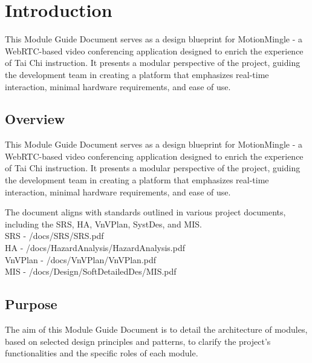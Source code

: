 \documentclass[12pt, titlepage]{article}
\begin{document}
\tableofcontents

\listoftables

\listoffigures

\newpage


\section{Introduction}

This Module Guide Document serves as a design blueprint for MotionMingle - a WebRTC-based video conferencing application designed to enrich the experience of Tai Chi instruction. It presents a modular perspective of the project, guiding the development team in creating a platform that emphasizes real-time interaction, minimal hardware requirements, and ease of use.

\subsection{Overview}
This Module Guide Document serves as a design blueprint for MotionMingle - a WebRTC-based video conferencing application designed to enrich the experience of Tai Chi instruction. It presents a modular perspective of the project, guiding the development team in creating a platform that emphasizes real-time interaction, minimal hardware requirements, and ease of use.

The document aligns with standards outlined in various project documents, including the SRS, HA, VnVPlan, SystDes, and MIS. \\

SRS - /docs/SRS/SRS.pdf \\

HA - /docs/HazardAnalysis/HazardAnalysis.pdf \\

VnVPlan - /docs/VnVPlan/VnVPlan.pdf \\ 

MIS - /docs/Design/SoftDetailedDes/MIS.pdf \\

\subsection{Purpose}
The aim of this Module Guide Document is to detail the architecture of modules, based on selected design principles and patterns, to clarify the project’s functionalities and the specific roles of each module.
\end{document}
